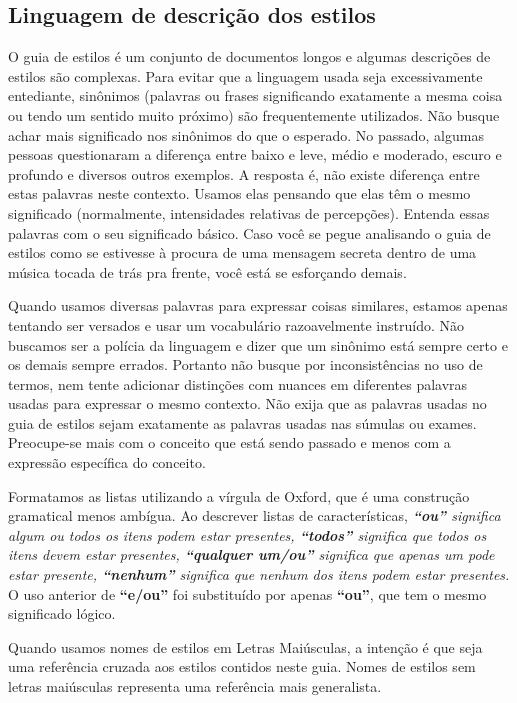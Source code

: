 \subsection*{Linguagem de descrição dos estilos}

O guia de estilos é um conjunto de documentos longos e algumas descrições de estilos são complexas. Para evitar que a linguagem usada seja excessivamente entediante, sinônimos (palavras ou frases significando exatamente a mesma coisa ou tendo um sentido muito próximo) são frequentemente utilizados. Não busque achar mais significado nos sinônimos do que o esperado. No passado, algumas pessoas questionaram a diferença entre baixo e leve, médio e moderado, escuro e profundo e diversos outros exemplos. A resposta é, não existe diferença entre estas palavras neste contexto. Usamos elas pensando que elas têm o mesmo significado (normalmente, intensidades relativas de percepções). Entenda essas palavras com o seu significado básico. Caso você se pegue analisando o guia de estilos como se estivesse à procura de uma mensagem secreta dentro de uma música tocada de trás pra frente, você está se esforçando demais.

Quando usamos diversas palavras para expressar coisas similares, estamos apenas tentando ser versados e usar um vocabulário razoavelmente instruído. Não buscamos ser a polícia da linguagem e dizer que um sinônimo está sempre certo e os demais sempre errados. Portanto não busque por inconsistências no uso de termos, nem tente adicionar distinções com nuances em diferentes palavras usadas para expressar o mesmo contexto. Não exija que as palavras usadas no guia de estilos sejam exatamente as palavras usadas nas súmulas ou exames. Preocupe-se mais com o conceito que está sendo passado e menos com a expressão específica do conceito.

Formatamos as listas utilizando a vírgula de Oxford, que é uma construção gramatical menos ambígua. Ao descrever listas de características, \textit{\textbf{“ou”} significa algum ou todos os itens podem estar presentes, \textbf{“todos”} significa que todos os itens devem estar presentes, \textbf{“qualquer um/ou”} significa que apenas um pode estar presente, \textbf{“nenhum”} significa que nenhum dos itens podem estar presentes.} O uso anterior de \textbf{“e/ou”} foi substituído por apenas \textbf{“ou”}, que tem o mesmo significado lógico.

Quando usamos nomes de estilos em Letras Maiúsculas, a intenção é que seja uma referência cruzada aos estilos contidos neste guia. Nomes de estilos sem letras maiúsculas representa uma referência mais generalista.

